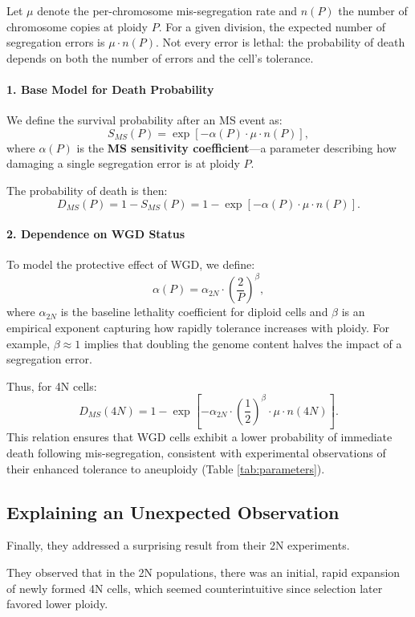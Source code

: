 \documentclass{article}
\begin{document}
Let $\mu$ denote the per-chromosome mis-segregation rate and $n(P)$ the number of chromosome copies at ploidy $P$. For a given division, the expected number of segregation errors is $\mu \cdot n(P)$. Not every error is lethal: the probability of death depends on both the number of errors and the cell’s tolerance.

\paragraph{1. Base Model for Death Probability}
We define the survival probability after an MS event as:
\[
S_{MS}(P) = \exp[-\alpha(P) \cdot \mu \cdot n(P)],
\]
where $\alpha(P)$ is the \textbf{MS sensitivity coefficient}—a parameter describing how damaging a single segregation error is at ploidy $P$.

The probability of death is then:
\[
D_{MS}(P) = 1 - S_{MS}(P) = 1 - \exp[-\alpha(P) \cdot \mu \cdot n(P)].
\]

\paragraph{2. Dependence on WGD Status}
\color{blue} To model the protective effect of WGD, we define:
\[
\alpha(P) = \alpha_{2N} \cdot \left(\frac{2}{P}\right)^{\beta},
\]
where $\alpha_{2N}$ is the baseline lethality coefficient for diploid cells and $\beta$ is an empirical exponent capturing how rapidly tolerance increases with ploidy. \color{black} For example, $\beta \approx 1$ implies that doubling the genome content halves the impact of a segregation error.

Thus, for 4N cells:
\[
D_{MS}(4N) = 1 - \exp[-\alpha_{2N} \cdot \left(\frac{1}{2}\right)^{\beta} \cdot \mu \cdot n(4N)].
\]
This relation ensures that WGD cells exhibit a lower probability of immediate death following mis-segregation, consistent with experimental observations of their enhanced tolerance to aneuploidy (Table \ref{tab:parameters}).




\subsection{Explaining an Unexpected Observation}
Finally, they addressed a surprising result from their 2N experiments.

They observed that in the 2N populations, there was an initial, rapid expansion of newly formed 4N cells, which seemed counterintuitive since selection later favored lower ploidy.
\end{document}
